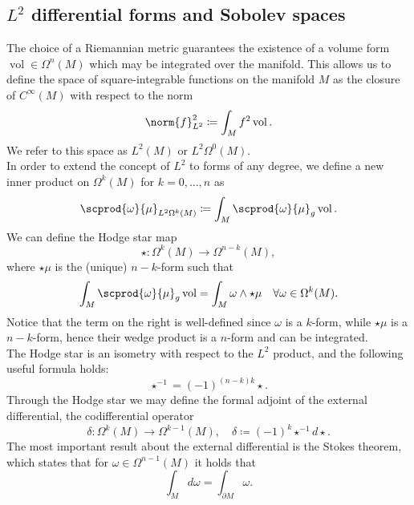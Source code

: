 \documentclass{ifacconf}
\newcommand{\drh}[2]{\Omega^{#2}(#1)}
\begin{document}
\subsection{$L^2$ differential forms and Sobolev spaces}
The choice of a Riemannian metric guarantees the existence of a volume form $\operatorname{vol}\in \drh{M}{n}$ which may be integrated over the manifold. This allows us to define the space of square-integrable functions on the manifold $M$ as the closure of $C^{\infty}(M)$ with respect to the norm
\[
\norm{f}_{L^2}^2\coloneqq \int_M f^2\operatorname{vol}.
\]
We refer to this space as $L^2(M)$ or $L^2\drh{M}{0}$.\\
In order to extend the concept of $L^2$ to forms of any degree, we define a new inner product on $\drh{M}{k}$ for $k=0,\dots,n$ as
\begin{equation}\label{l2p}
    \scprod{\omega}{\mu}_{L^2\drh{M}{k}}\coloneqq \int_M \scprod{\omega}{\mu}_g\operatorname{vol}.
\end{equation}
We can define the Hodge star map
\begin{equation}
    \star\colon\drh{M}{k}\to\drh{M}{n-k},
\end{equation}
where $\star\mu$ is the (unique) $n-k$-form such that
\begin{equation}\label{HStar}
    \int_M \scprod{\omega}{\mu}_g\operatorname{vol}=\int_M \omega\wedge\star\mu \quad \forall\omega\in\drh{M}{k}.
\end{equation}
Notice that the term on the right is well-defined since $\omega$ is a $k$-form, while $\star\mu$ is a $n-k$-form, hence their wedge product is a $n$-form and can be integrated.\\
The Hodge star is an isometry with respect to the $L^2$ product, and the following useful formula holds:
\begin{equation}\label{invHS}
    \star^{-1}=(-1)^{(n-k)k}\star.
\end{equation}
Through the Hodge star we may define the formal adjoint of the external differential, the codifferential operator
\begin{equation}\label{delta}
    \delta\colon \drh{M}{k}\to\drh{M}{k-1},\quad \delta\coloneqq (-1)^k\star^{-1}d\star.
\end{equation}
The most important result about the external differential is the Stokes theorem, which states that for $\omega\in \drh{M}{n-1}$ it holds that
\begin{equation}\label{Stokes}
    \int_M d\omega = \int_{\partial M}\omega.
\end{equation}
\end{document}
